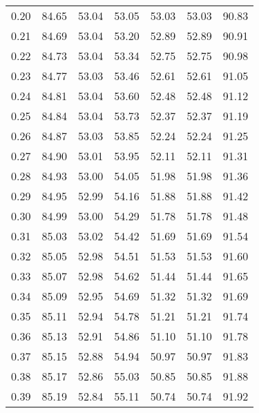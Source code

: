 \begin{tabular}{|c|c|c|c|c|c|c|}
      0.20 &     84.65 &     53.04 &      53.05 &   53.03 &      53.03 &         90.83 \\
      0.21 &     84.69 &     53.04 &      53.20 &   52.89 &      52.89 &         90.91 \\
      0.22 &     84.73 &     53.04 &      53.34 &   52.75 &      52.75 &         90.98 \\
      0.23 &     84.77 &     53.03 &      53.46 &   52.61 &      52.61 &         91.05 \\
      0.24 &     84.81 &     53.04 &      53.60 &   52.48 &      52.48 &         91.12 \\
      0.25 &     84.84 &     53.04 &      53.73 &   52.37 &      52.37 &         91.19 \\
      0.26 &     84.87 &     53.03 &      53.85 &   52.24 &      52.24 &         91.25 \\
      0.27 &     84.90 &     53.01 &      53.95 &   52.11 &      52.11 &         91.31 \\
      0.28 &     84.93 &     53.00 &      54.05 &   51.98 &      51.98 &         91.36 \\
      0.29 &     84.95 &     52.99 &      54.16 &   51.88 &      51.88 &         91.42 \\
      0.30 &     84.99 &     53.00 &      54.29 &   51.78 &      51.78 &         91.48 \\
      0.31 &     85.03 &     53.02 &      54.42 &   51.69 &      51.69 &         91.54 \\
      0.32 &     85.05 &     52.98 &      54.51 &   51.53 &      51.53 &         91.60 \\
      0.33 &     85.07 &     52.98 &      54.62 &   51.44 &      51.44 &         91.65 \\
      0.34 &     85.09 &     52.95 &      54.69 &   51.32 &      51.32 &         91.69 \\
      0.35 &     85.11 &     52.94 &      54.78 &   51.21 &      51.21 &         91.74 \\
      0.36 &     85.13 &     52.91 &      54.86 &   51.10 &      51.10 &         91.78 \\
      0.37 &     85.15 &     52.88 &      54.94 &   50.97 &      50.97 &         91.83 \\
      0.38 &     85.17 &     52.86 &      55.03 &   50.85 &      50.85 &         91.88 \\
      0.39 &     85.19 &     52.84 &      55.11 &   50.74 &      50.74 &         91.92 \\

\end{tabular}
